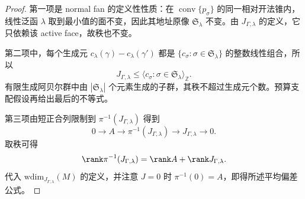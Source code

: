 \begin{proof}
第一项是 normal fan 的定义性性质：在 \(\operatorname{conv}\{p_\sigma\}\) 的同一相对开法锥内，线性泛函 \(\lambda\) 取到最小值的面不变，因此其地址原像 \(\mathfrak S_\lambda\) 不变。由 \(J_{\Gamma,\lambda}\) 的定义，它只依赖该 active face，故秩也不变。

第二项中，每个生成元
\(c_\lambda(\gamma)-c_\lambda(\gamma')\) 都是 \(\{c_\sigma:\sigma\in\mathfrak S_\lambda\}\) 的整数线性组合，所以
\[
J_{\Gamma,\lambda}\le \langle c_\sigma:\sigma\in\mathfrak S_\lambda\rangle_{\mathbb Z}.
\]
有限生成阿贝尔群中由 \(|\mathfrak S_\lambda|\) 个元素生成的子群，其秩不超过生成元个数。预算支配假设再给出最后的不等式。

第三项由短正合列限制到 \(\pi^{-1}(J_{\Gamma,\lambda})\) 得到
\[
0\to A\to \pi^{-1}(J_{\Gamma,\lambda})\to J_{\Gamma,\lambda}\to0.
\]
取秩可得
\[
\rank\pi^{-1}(J_{\Gamma,\lambda})=\rank A+\rank J_{\Gamma,\lambda}.
\]
代入 \(\mathrm{wdim}_{J_{\Gamma,\lambda}}(M)\) 的定义，并注意 \(J=0\) 时 \(\pi^{-1}(0)=A\)，即得所述平均偏差公式。
\end{proof}

\endinput

